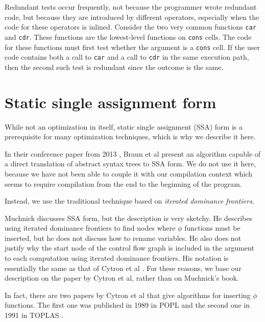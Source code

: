 Redundant tests occur frequently, not because the programmer wrote
redundant code, but because they are introduced by different
\commonlisp{} operators, especially when the code for these operators
is inlined.  Consider the two very common \commonlisp{} functions
\texttt{car} and \texttt{cdr}.  These functions are the lowest-level
functions on \texttt{cons} cells.  The code for these functions must
first test whether the argument is a \texttt{cons} cell.  If the user
code contains both a call to \texttt{car} and a call to \texttt{cdr}
in the same execution path, then the second such test is redundant
since the outcome is the same.

\section{Static single assignment form}
\label{mir-optimizations-ssa-form}

While not an optimization in itself, static single assignment (SSA)
form is a prerequisite for many optimization techniques, which is why
we describe it here. 

In their conference paper from 2013
\cite{Braun:2013:SEC:2450247.2450258}, Braun et al present an
algorithm capable of a direct translation of abstract syntax trees to
SSA form.  We do not use it here, because we have not been able to
couple it with our compilation context which seems to require
compilation from the end to the beginning of the program. 

Instead, we use the traditional technique based on \emph{iterated
  dominance frontiers}.

Muchnick \cite{Muchnick:1998:ACD:286076} discusses SSA form, but the
description is very sketchy.  He describes using iterated dominance
frontiers to find nodes where $\phi$ functions must be inserted, but
he does not discuss how to rename variables.  He also does not justify
why the start node of the control flow graph is included in the
argument to each computation using iterated dominance frontiers.  His
notation is essentially the same as that of Cytron et al
\cite{Cytron:1991:ECS:115372.115320}.  For these reasons, we base our
description on the paper by Cytron et al, rather than on Muchnick's
book.

In fact, there are two papers by Cytron et al that give algorithms for
inserting $\phi$ functions.  The first one was published in 1989 in
POPL \cite{Cytron:1989:EMC:75277.75280} and the second one in 1991 in
TOPLAS \cite{Cytron:1991:ECS:115372.115320}.

